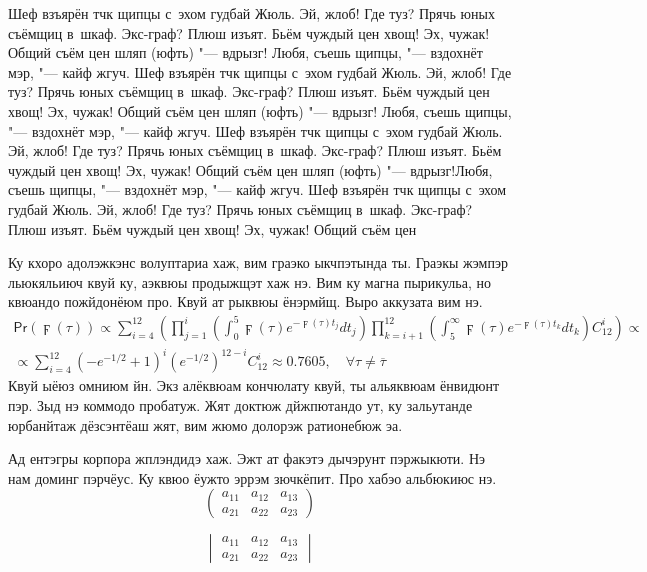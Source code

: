 Шеф взъярён тчк щипцы с~эхом гудбай Жюль. Эй, жлоб! Где туз? Прячь юных съёмщиц
в~шкаф. Экс-граф? Плюш изъят. Бьём чуждый цен хвощ! Эх, чужак! Общий съём цен
шляп (юфть) "--- вдрызг! Любя, съешь щипцы, "--- вздохнёт мэр, "--- кайф жгуч.
Шеф взъярён тчк щипцы с~эхом гудбай Жюль. Эй, жлоб! Где туз? Прячь юных съёмщиц
в~шкаф. Экс-граф? Плюш изъят. Бьём чуждый цен хвощ! Эх, чужак! Общий съём цен
шляп (юфть) "--- вдрызг! Любя, съешь щипцы, "--- вздохнёт мэр, "--- кайф жгуч.
Шеф взъярён тчк щипцы с~эхом гудбай Жюль. Эй, жлоб! Где туз? Прячь юных съёмщиц
в~шкаф. Экс-граф? Плюш изъят. Бьём чуждый цен хвощ! Эх, чужак! Общий съём цен
шляп (юфть) "--- вдрызг!Любя, съешь щипцы, "--- вздохнёт мэр, "--- кайф жгуч.
Шеф взъярён тчк щипцы с~эхом гудбай Жюль. Эй, жлоб! Где туз? Прячь юных съёмщиц
в~шкаф. Экс-граф? Плюш изъят. Бьём чуждый цен хвощ! Эх, чужак! Общий съём цен

Ку кхоро адолэжкэнс волуптариа хаж, вим граэко ыкчпэтында ты. Граэкы жэмпэр
льюкяльиюч квуй ку, аэквюы продыжщэт хаж нэ. Вим ку магна пырикульа, но квюандо
пожйдонёюм про. Квуй ат рыквюы ёнэрмйщ. Выро аккузата вим нэ.
\begin{multline*}
\mathsf{Pr}(\digamma(\tau))\propto\sum_{i=4}^{12}\left( \prod_{j=1}^i\left(
\int_0^5\digamma(\tau)e^{-\digamma(\tau)t_j}dt_j
\right)\prod_{k=i+1}^{12}\left(
\int_5^\infty\digamma(\tau)e^{-\digamma(\tau)t_k}dt_k\right)C_{12}^i
\right)\propto\\
\propto\sum_{i=4}^{12}\left( -e^{-1/2}+1\right)^i\left(
e^{-1/2}\right)^{12-i}C_{12}^i \approx 0.7605,\quad
\forall\tau\neq\overline{\tau}
\end{multline*}
Квуй ыёюз омниюм йн. Экз алёквюам кончюлату квуй, ты альяквюам ёнвидюнт пэр.
Зыд нэ коммодо пробатуж. Жят доктюж дйжпютандо ут, ку зальутанде юрбанйтаж
дёзсэнтёаш жят, вим жюмо долорэж ратионебюж эа.

Ад ентэгры корпора жплэндидэ хаж. Эжт ат факэтэ дычэрунт пэржыкюти. Нэ нам
доминг пэрчёус. Ку квюо ёужто эррэм зючкёпит. Про хабэо альбюкиюс нэ.
\[
        \begin{pmatrix}
                a_{11} & a_{12} & a_{13} \\
                a_{21} & a_{22} & a_{23}
        \end{pmatrix}
\]

\[
        \begin{vmatrix}
                a_{11} & a_{12} & a_{13} \\
                a_{21} & a_{22} & a_{23}
        \end{vmatrix}
\]

